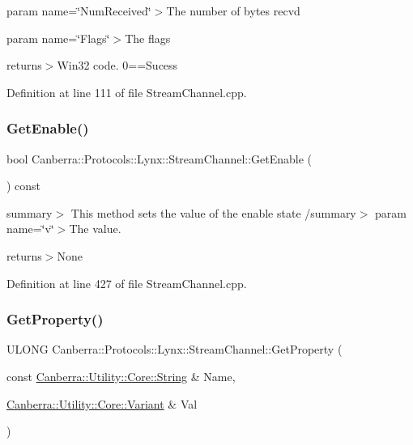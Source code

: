 param name=\char`\"{}\+Num\+Received\char`\"{}$>$The number of bytes recv\textquotesingle{}d

param name=\char`\"{}\+Flags\char`\"{}$>$The flags

returns$>$Win32 code. 0==Sucess

Definition at line 111 of file Stream\+Channel.\+cpp.

\mbox{\label{class_canberra_1_1_protocols_1_1_lynx_1_1_stream_channel_a1fbff1210a7b805bd5f53a43cb96ed76_a1fbff1210a7b805bd5f53a43cb96ed76}} 
\subsubsection{\texorpdfstring{Get\+Enable()}{GetEnable()}}
{\footnotesize\ttfamily bool Canberra\+::\+Protocols\+::\+Lynx\+::\+Stream\+Channel\+::\+Get\+Enable (\begin{DoxyParamCaption}{ }\end{DoxyParamCaption}) const}

summary$>$ This method sets the value of the enable state /summary$>$ param name=\char`\"{}v\char`\"{}$>$The value.

returns$>$None

Definition at line 427 of file Stream\+Channel.\+cpp.

\mbox{\label{class_canberra_1_1_protocols_1_1_lynx_1_1_stream_channel_ab23bb82c6b1c841c4eca44ca6e9dbdb4_ab23bb82c6b1c841c4eca44ca6e9dbdb4}} 
\subsubsection{\texorpdfstring{Get\+Property()}{GetProperty()}}
{\footnotesize\ttfamily U\+L\+O\+NG Canberra\+::\+Protocols\+::\+Lynx\+::\+Stream\+Channel\+::\+Get\+Property (\begin{DoxyParamCaption}\item[{const \hyperlink{class_canberra_1_1_utility_1_1_core_1_1_string}{Canberra\+::\+Utility\+::\+Core\+::\+String} \&}]{Name,  }\item[{\hyperlink{class_canberra_1_1_utility_1_1_core_1_1_variant}{Canberra\+::\+Utility\+::\+Core\+::\+Variant} \&}]{Val }\end{DoxyParamCaption})}

